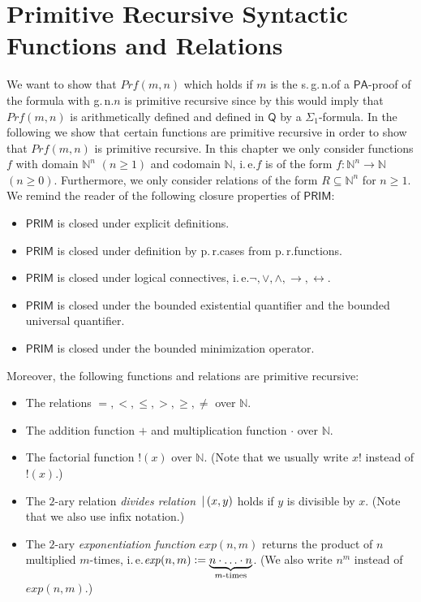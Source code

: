 \section{Primitive Recursive Syntactic Functions and Relations}
We want to show that $\mathit{Prf}(m,n)$ which holds if $m$ is the s.\,g.\,n.\@ of a $\mathsf{PA}$-proof of the formula with g.\,n.\@ $n$ is primitive recursive since by  this would imply that $\mathit{Prf}(m,n)$ is arithmetically defined and defined in $\mathsf{Q}$ by a $\Sigma_1$-formula. In the following we show that certain functions are primitive recursive in order to show that $\mathit{Prf}(m,n)$ is primitive recursive. In this chapter we only consider functions $f$ with domain $\mathbb{N}^n$ $(n \ge 1)$ and codomain $\mathbb{N}$, i.\,e.\@ $f$ is of the form $f: \mathbb{N}^n \rightarrow \mathbb{N}$ $(n\ge 0)$. Furthermore, we only consider relations of the form $R\subseteq \mathbb{N}^n$ for $n \ge 1$. 
\\

We remind the reader of the following closure properties of $\mathsf{PRIM}$:

\begin{itemize}
\item $\mathsf{PRIM}$ is closed under explicit definitions.
\item $\mathsf{PRIM}$ is closed under definition by p.\,r.\@ cases from p.\,r.\@ functions.
\item $\mathsf{PRIM}$ is closed under logical connectives, i.\,e.\@ $\lnot, \vee, \wedge, \rightarrow, \leftrightarrow$.
\item $\mathsf{PRIM}$ is closed under the bounded existential quantifier and the bounded universal quantifier.
\item $\mathsf{PRIM}$ is closed under the bounded minimization operator.
\end{itemize}

Moreover, the following functions and relations are primitive recursive:
\begin{itemize}
\item The relations $=, <, \le, >, \ge, \neq$ over $\mathbb{N}$.
\item The addition function $+$ and multiplication function $\cdot$ over $\mathbb{N}$.
\item The factorial function $!(x)$ over $\mathbb{N}$. (Note that we usually write $x!$ instead of $!(x)$.)
\item The $2$-ary relation \textit{divides relation} $\,|\,(x,y)$ holds if $y$ is divisible by $x$. (Note that we also use infix notation.)
\item The $2$-ary \textit{exponentiation function} $\mathit{exp}(n,m)$ returns the product of $n$ multiplied $m$-times, i.\,e.\@ $\mathit{exp}(n,m)\vcentcolon= \underbrace{n \cdot \ldots \cdot n}_{m\text{-times}}$. (We also write $n^m$ instead of $\mathit{exp}(n,m)$.)
\end{itemize}

